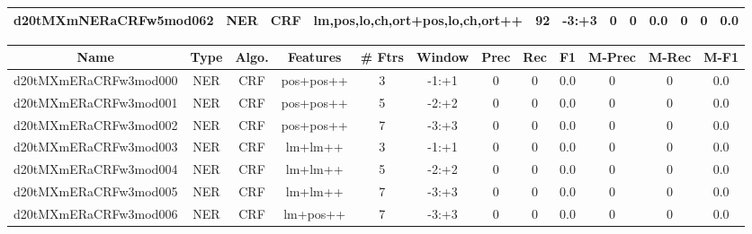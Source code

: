 \documentclass[a4paper]{article}
\begin{document}
\begin{landscape}
\begin{center}
\begin{tabular}{ |c|c|c|c|c|c|c|c|c|c|c|c|}
 
 	
 	\small{ d20tMXmNERaCRFw5mod062 } & \small{ NER} & \small{  CRF }  & lm,pos,lo,ch,ort+pos,lo,ch,ort++  &  92 &  \small{  -3:+3 }  &  0 & 0 & 0.0  &  0 & 0 & 0.0 \\
 	
 \hline
\end{tabular}
\end{center}




\begin{center}
\begin{tabular}{ |c|c|c|c|c|c|c|c|c|c|c|c|} 
 \hline
 	Name & Type & Algo. & Features & \# Ftrs & Window & Prec & Rec & F1 & M-Prec & M-Rec & M-F1\\
 \hline

 	

 
 	
 	\small{ d20tMXmERaCRFw3mod000 } & \small{ NER} & \small{  CRF }  & pos+pos++  &  3 &  \small{  -1:+1 }  &  0 & 0 & 0.0  &  0 & 0 & 0.0 \\
 	

 
 	
 	\small{ d20tMXmERaCRFw3mod001 } & \small{ NER} & \small{  CRF }  & pos+pos++  &  5 &  \small{  -2:+2 }  &  0 & 0 & 0.0  &  0 & 0 & 0.0 \\
 	

 
 	
 	\small{ d20tMXmERaCRFw3mod002 } & \small{ NER} & \small{  CRF }  & pos+pos++  &  7 &  \small{  -3:+3 }  &  0 & 0 & 0.0  &  0 & 0 & 0.0 \\
 	

 
 	
 	\small{ d20tMXmERaCRFw3mod003 } & \small{ NER} & \small{  CRF }  & lm+lm++  &  3 &  \small{  -1:+1 }  &  0 & 0 & 0.0  &  0 & 0 & 0.0 \\
 	

 
 	
 	\small{ d20tMXmERaCRFw3mod004 } & \small{ NER} & \small{  CRF }  & lm+lm++  &  5 &  \small{  -2:+2 }  &  0 & 0 & 0.0  &  0 & 0 & 0.0 \\
 	

 
 	
 	\small{ d20tMXmERaCRFw3mod005 } & \small{ NER} & \small{  CRF }  & lm+lm++  &  7 &  \small{  -3:+3 }  &  0 & 0 & 0.0  &  0 & 0 & 0.0 \\
 	

 
 	
 	\small{ d20tMXmERaCRFw3mod006 } & \small{ NER} & \small{  CRF }  & lm+pos++  &  7 &  \small{  -3:+3 }  &  0 & 0 & 0.0  &  0 & 0 & 0.0 \\
 	


\end{tabular}
\end{center}
\end{landscape}
\end{document}
